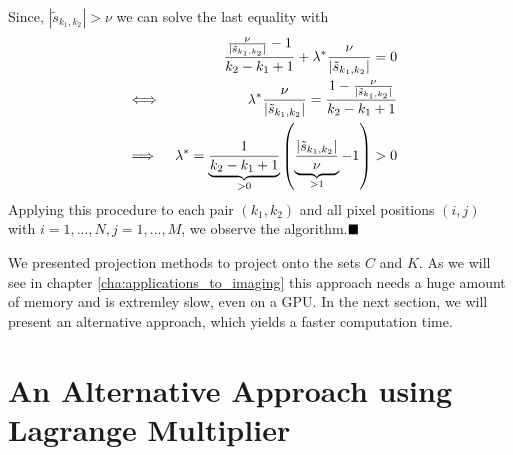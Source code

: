 \documentclass{scrreprt}
\newcommand{\qed}{$\hfill\blacksquare$}
\newenvironment{proof}[1][Proof]{\begin{trivlist}
\item[\hskip \labelsep {\bfseries #1}]}{\end{trivlist}}
\begin{document}
\begin{proof}
\begin{eqnarray}
                \end{eqnarray}
            Since, $|\tilde{s}_{k_{1}, k_{2}}| > \nu$ we can solve the last equality with
                \begin{eqnarray}
                    && \frac{\frac{\nu}{|\tilde{s}_{k_{1}, k_{2}}|} - 1}{k_{2} - k_{1} + 1} + \lambda^{\ast}\frac{\nu}{|\tilde{s}_{k_{1}, k_{2}}|} = 0 \notag \\
                    &\iff& \lambda^{\ast}\frac{\nu}{|\tilde{s}_{k_{1}, k_{2}}|} = \frac{1 - \frac{\nu}{|\tilde{s}_{k_{1}, k_{2}}|}}{k_{2} - k_{1} + 1} \notag \\
                    &\implies& \lambda^{\ast} = \underbrace{\frac{1}{k_{2} - k_{1} + 1}}_{> 0} \left( \underbrace{\frac{|\tilde{s}_{k_{1}, k_{2}}|}{\nu}}_{> 1} - 1 \right) > 0 \notag
                \end{eqnarray}
            Applying this procedure to each pair $(k_{1}, k_{2})$ and all pixel positions $(i, j)$ with $i = 1, ..., N, j = 1, ..., M$, we observe the algorithm.\qed
        \end{proof}

    We presented projection methods to project onto the sets $C$ and $K$. As we will see in chapter \ref{cha:applications_to_imaging} this approach needs a huge amount of memory and is extremley slow, even on a GPU. In the next section, we will present an alternative approach, which yields a faster computation time.


    \section{An Alternative Approach using Lagrange Multiplier} %
    \label{sec:an_alternative_approach_using_lagrangre_multipliers}
        
\end{document}
